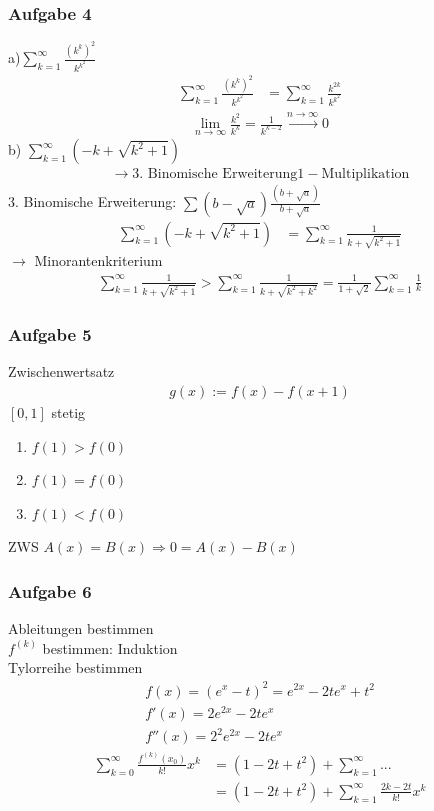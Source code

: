 \subsubsection{Aufgabe 4}
a)$\sum_{k=1}^\infty \frac{(k^k)^2}{k^{k^2}}$
\begin{align*}
     \sum_{k=1}^\infty \frac{(k^k)^2}{k^{k^2}} &= \sum_{k=1}^\infty \frac{k^{2k}}{k^{k^2}}
\end{align*}
\begin{align*}
    \lim_{n \rightarrow \infty} \frac{k^2}{k^k} = \frac{1}{k^{k - 2}} \overset{n \rightarrow \infty}{\rightarrow} 0
\end{align*}
b) $\sum_{k=1}^\infty (-k + \sqrt{k^2 + 1})$
\begin{align*}
    \rightarrow \text{3. Binomische Erweiterung} 1- \text{Multiplikation}
\end{align*}
3. Binomische Erweiterung: $\sum (b -  \sqrt{a}) \frac{(b + \sqrt{a})}{b + \sqrt{a}}$
\begin{align*}
    \sum_{k=1}^\infty (-k + \sqrt{k^2 + 1}) &= \sum_{k=1}^\infty \frac{1}{k + \sqrt{k^2 + 1}}
\end{align*}
$\rightarrow $ Minorantenkriterium 
\begin{align*}
    \sum_{k=1}^\infty \frac{1}{k + \sqrt{k^2 + 1}} > \sum_{k=1}^\infty \frac{1}{k + \sqrt{k^2  + k^2}} = \frac{1}{1 + \sqrt{2}} \sum_{k=1}^\infty \frac{1}{k}
\end{align*}
\subsubsection{Aufgabe 5}
Zwischenwertsatz
\begin{align*}
    g(x) := f(x) - f(x + 1)
\end{align*}
$ [0, 1]$ stetig\\
\begin{enumerate}
    \item $f(1) > f(0) $
    \item $f(1) = f(0) $
    \item $f(1) < f(0) $
\end{enumerate}
ZWS $A(x) = B(x) \Rightarrow 0 = A(x) - B(x) $
\subsubsection{Aufgabe 6}
Ableitungen bestimmen\\
$f^{(k)}$ bestimmen: Induktion\\
Tylorreihe bestimmen\\
\begin{align*}
    f(x) = (e^x - t)^2 = e^{2x} - 2te^x +t^2\\
    f'(x) = 2e^{2x} - 2te^x\\
    f''(x) = 2^2 e^{2x} - 2te^x
\end{align*}
\begin{align*}
    \sum_{k = 0}^\infty \frac{f^{(k)}(x_0)}{k!} x^k &= (1 - 2t + t^2) + \sum_{k=1}^\infty ...\\
    &= (1 - 2t + t^2) + \sum_{k = 1}^\infty  \frac{2k - 2t}{k!} x^k
 \end{align*}
